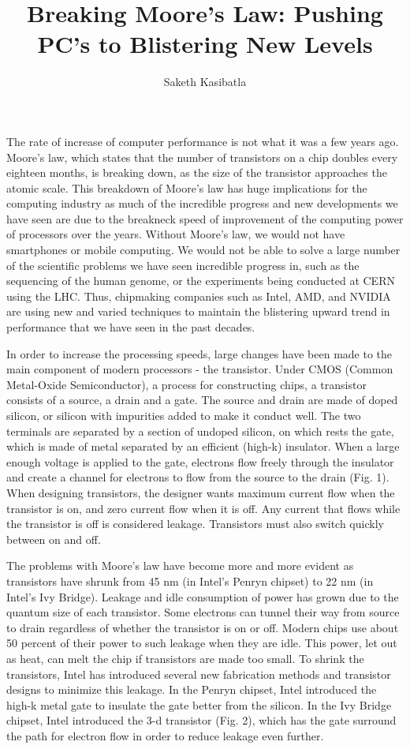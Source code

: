 \documentclass[12pt]{article}
\title{Breaking Moore’s Law: Pushing PC’s to Blistering New Levels}
\author{Saketh Kasibatla}
\begin{document}
\maketitle

The rate of increase of computer performance is not what it was a few years ago. Moore's law, which states that the number of transistors on a chip doubles every eighteen months, is breaking down, as the size of the transistor approaches the atomic scale. This breakdown of Moore's law has huge implications for the computing industry as much of the incredible progress and new developments we have seen are due to the breakneck speed of improvement of the computing power of processors over the years. Without Moore's law, we would not have smartphones or mobile computing. We would not be able to solve a large number of the scientific problems we have seen incredible progress in, such as the sequencing of the human genome, or the experiments being conducted at CERN using the LHC. Thus, chipmaking companies such as Intel, AMD, and NVIDIA are using new and varied techniques to maintain the blistering upward trend in performance that we have seen in the past decades.

In order to increase the processing speeds, large changes have been made to the main component of modern processors - the transistor. Under CMOS (Common Metal-Oxide Semiconductor), a process for constructing chips, a transistor consists of a source, a drain and a gate. The source and drain are made of doped silicon, or silicon with impurities added to make it conduct well. The two terminals are separated by a section of undoped silicon, on which rests the gate, which is made of metal separated by an efficient (high-k) insulator. When a large enough voltage is applied to the gate, electrons flow freely through the insulator and create a channel for electrons to flow from the source to the drain\cite{watrous_mosfet_1976} (Fig. 1). When designing transistors, the designer wants maximum current flow when the transistor is on, and zero current flow when it is off. Any current that flows while the transistor is off is considered leakage. Transistors must also switch quickly between on and off\cite{channelintel_video_2011}.

The problems with Moore's law have become more and more evident as transistors have shrunk from 45 nm (in Intel's Penryn chipset) to 22 nm (in Intel's Ivy Bridge). Leakage and idle consumption of power has grown due to the quantum size of each transistor. Some electrons can tunnel their way from source to drain regardless of whether the transistor is on or off. Modern chips use about 50 percent of their power to such leakage when they are idle\cite{1250885}. This power, let out as heat, can melt the chip if transistors are made too small. To shrink the transistors, Intel has introduced several new fabrication methods and transistor designs to minimize this leakage. In the Penryn chipset, Intel introduced the high-k metal gate to insulate the gate better from the silicon. In the Ivy Bridge chipset, Intel introduced the 3-d transistor (Fig. 2), which has the gate surround the path for electron flow in order to reduce leakage even further\cite{chacos_breaking_2013}.
\end{document}
